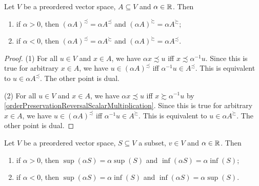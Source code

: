 \begin{lemma} \label{scalarMultipleUpperLowerBounds}
Let $V$ be a preordered vector space, $A\subseteq V$ and $\alpha\in \mathbb{R}$. Then
\begin{enumerate}
\item if $\alpha > 0$, then $(\alpha A)^\precsim = \alpha A^\precsim$ and $(\alpha A)^\succsim = \alpha A^\succsim$;
\item if $\alpha < 0$, then $(\alpha A)^\precsim = \alpha A^\succsim$ and $(\alpha A)^\succsim = \alpha A^\precsim$.
\end{enumerate}
\end{lemma}
\begin{proof}
(1) For all $u\in V$ and $x\in A$, we have $\alpha x \precsim u$ iff $x\precsim \alpha^{-1}u$. Since this is true for arbitrary $x\in A$, we have $u\in (\alpha A)^\precsim$ iff $\alpha^{-1}u\in A^\precsim$. This is equivalent to $u\in \alpha A^\precsim$. The other point is dual.

(2) For all $u\in V$ and $x\in A$, we have $\alpha x \precsim u$ iff $x\succsim \alpha^{-1}u$ by \ref{orderPreservationReversalScalarMultiplication}. Since this is true for arbitrary $x\in A$, we have $u\in (\alpha A)^\precsim$ iff $\alpha^{-1}u\in A^\succsim$. This is equivalent to $u\in \alpha A^\succsim$. The other point is dual.
\end{proof}
\begin{corollary} \label{scalarMultipleOrderHomomorphism}
Let $V$ be a preordered vector space, $S\subseteq V$ a subset, $v\in V$ and $\alpha\in \mathbb{R}$. Then
\begin{enumerate}
\item if $\alpha > 0$, then $\sup(\alpha S) = \alpha \sup(S)$ and $\inf(\alpha S) = \alpha \inf(S)$;
\item if $\alpha < 0$, then $\sup(\alpha S) = \alpha \inf(S)$ and $\inf(\alpha S) = \alpha \sup(S)$.
\end{enumerate}
\end{corollary}

